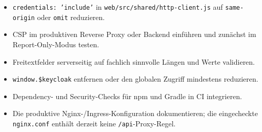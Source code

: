 \begin{itemize}
  \item \texttt{credentials: 'include'} in
    \texttt{web/src/shared/http-client.js} auf \texttt{same-origin}
    oder \texttt{omit} reduzieren.
  \item CSP im produktiven Reverse Proxy oder Backend einführen und
    zunächst im Report-Only-Modus testen.
  \item Freitextfelder serverseitig auf fachlich sinnvolle Längen und
    Werte validieren.
  \item \texttt{window.\$keycloak} entfernen oder den globalen
    Zugriff mindestens reduzieren.
  \item Dependency- und Security-Checks für npm und Gradle in CI integrieren.
  \item Die produktive Nginx-/Ingress-Konfiguration dokumentieren;
    die eingecheckte \texttt{nginx.conf} enthält derzeit keine
    \texttt{/api}-Proxy-Regel.
\end{itemize}
